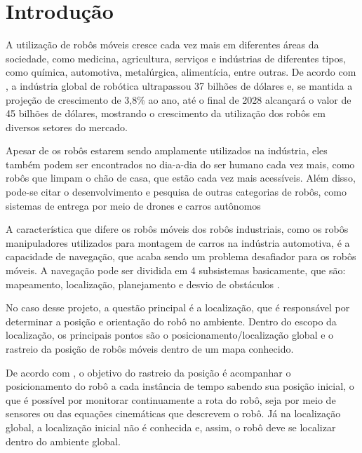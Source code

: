 \documentclass[acronym, symbols, table]{fei}
\begin{document}
\begin{abstract}
	
	
	
\end{abstract}

\listoffigures
\listoftables
\listofalgorithms
\printglossary[type=\acronymtype]
\tableofcontents
\setcounter{table}{0}

\chapter{Introdução}

	A utilização de robôs móveis cresce cada vez mais em diferentes áreas da sociedade, como medicina, agricultura, serviços e indústrias de diferentes tipos, como química, automotiva, metalúrgica, alimentícia, entre outras. De acordo com \textcite{robotics_market}, a indústria global de robótica ultrapassou 37 bilhões de dólares e, se mantida a projeção de crescimento de 3,8\% ao ano, até o final de 2028 alcançará o valor de 45 bilhões de dólares, mostrando o crescimento da utilização dos robôs em diversos setores do mercado.
	
	Apesar de os robôs estarem sendo amplamente utilizados na indústria, eles também podem ser encontrados no dia-a-dia do ser humano cada vez mais, como robôs que limpam o chão de casa, que estão cada vez mais acessíveis. Além disso, pode-se citar o desenvolvimento e pesquisa de outras categorias de robôs, como sistemas de entrega por meio de drones \cite{su14010360} e carros autônomos \cite{parekh2022review}
	
	A característica que difere os robôs móveis dos robôs industriais, como os robôs manipuladores utilizados para montagem de carros na indústria automotiva, é a capacidade de navegação, que acaba sendo um problema desafiador para os robôs móveis. A navegação pode ser dividida em 4 subsistemas basicamente, que são: mapeamento, localização, planejamento e desvio de obstáculos \cite{app12146951}. 
	
	No caso desse projeto, a questão principal é a localização, que é responsável por determinar a posição e orientação do robô no ambiente. Dentro do escopo da localização, os principais pontos são o posicionamento/localização global e o rastreio da posição de robôs móveis dentro de um mapa conhecido.
	
	De acordo com \textcite{PANIGRAHI20226019}, o objetivo do rastreio da posição é acompanhar o posicionamento do robô a cada instância de tempo sabendo sua posição inicial, o que é possível por monitorar continuamente a rota do robô, seja por meio de sensores ou das equações cinemáticas que descrevem o robô. Já na localização global, a localização inicial não é conhecida e, assim, o robô deve se localizar dentro do ambiente global.
	
\end{document}
